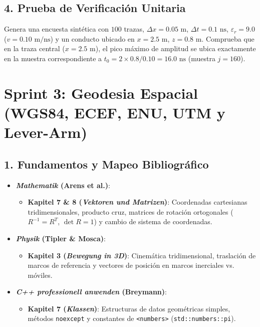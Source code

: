 \documentclass[11pt,a4paper]{article}
\begin{document}
\subsection{4. Prueba de Verificación Unitaria}
Genera una encuesta sintética con $100$ trazas, $\Delta x = 0.05\text{ m}$, $\Delta t = 0.1\text{ ns}$, $\varepsilon_r = 9.0$ ($v = 0.10\text{ m/ns}$) y un conducto ubicado en $x = 2.5\text{ m}$, $z = 0.8\text{ m}$.
Comprueba que en la traza central ($x = 2.5\text{ m}$), el pico máximo de amplitud se ubica exactamente en la muestra correspondiente a $t_0 = 2 \times 0.8 / 0.10 = 16.0\text{ ns}$ (muestra $j = 160$).

\section{Sprint 3: Geodesia Espacial (WGS84, ECEF, ENU, UTM y Lever-Arm)}

\subsection{1. Fundamentos y Mapeo Bibliográfico}
\begin{itemize}
    \item \textbf{\textit{Mathematik} (Arens et al.)}:
    \begin{itemize}
        \item \textbf{Kapitel 7 \& 8 (\textit{Vektoren und Matrizen})}: Coordenadas cartesianas tridimensionales, producto cruz, matrices de rotación ortogonales ($R^{-1} = R^T$, $\det R = 1$) y cambio de sistema de coordenadas.
    \end{itemize}
    \item \textbf{\textit{Physik} (Tipler \& Mosca)}:
    \begin{itemize}
        \item \textbf{Kapitel 3 (\textit{Bewegung in 3D})}: Cinemática tridimensional, traslación de marcos de referencia y vectores de posición en marcos inerciales vs. móviles.
    \end{itemize}
    \item \textbf{\textit{C++ professionell anwenden} (Breymann)}:
    \begin{itemize}
        \item \textbf{Kapitel 7 (\textit{Klassen})}: Estructuras de datos geométricas simples, métodos \texttt{noexcept} y constantes de \texttt{<numbers>} (\texttt{std::numbers::pi}).
    \end{itemize}
\end{itemize}
\end{document}
